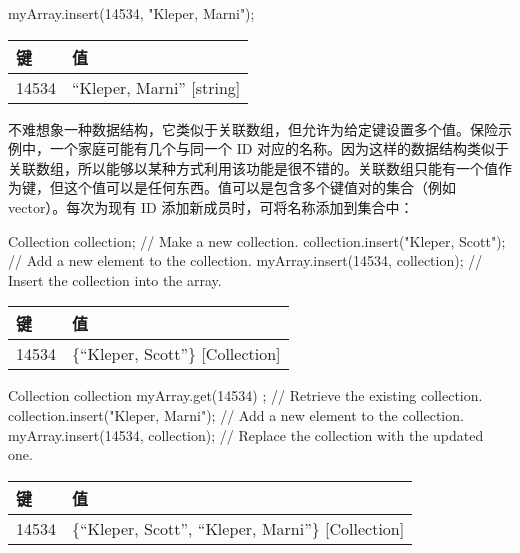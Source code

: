 \begin{cpp}
myArray.insert(14534, "Kleper, Marni");
\end{cpp}

\begin{longtable}{|l|l|}
\hline
\textbf{键} & \textbf{值}              \\ \hline
\endfirsthead
%
\endhead
%
14534         & “Kleper, Marni” {[}string{]} \\ \hline
\end{longtable}

不难想象一种数据结构，它类似于关联数组，但允许为给定键设置多个值。保险示例中，一个家庭可能有几个与同一个 ID 对应的名称。因为这样的数据结构类似于关联数组，所以能够以某种方式利用该功能是很不错的。关联数组只能有一个值作为键，但这个值可以是任何东西。值可以是包含多个键值对的集合（例如vector）。每次为现有 ID 添加新成员时，可将名称添加到集合中：

\begin{cpp}
Collection collection; // Make a new collection.
collection.insert("Kleper, Scott"); // Add a new element to the collection.
myArray.insert(14534, collection); // Insert the collection into the array.
\end{cpp}

\begin{longtable}{|l|l|}
\hline
\textbf{键} & \textbf{值}                      \\ \hline
\endfirsthead
%
\endhead
%
14534         & \{“Kleper, Scott”\} {[}Collection{]} \\ \hline
\end{longtable}

\begin{cpp}
Collection collection { myArray.get(14534) }; // Retrieve the existing collection.
collection.insert("Kleper, Marni"); // Add a new element to the collection.
myArray.insert(14534, collection); // Replace the collection with the updated one.
\end{cpp}

\begin{longtable}{|l|l|}
\hline
\textbf{键} & \textbf{值}                                       \\ \hline
\endfirsthead
%
\endhead
%
14534         & \{“Kleper, Scott”, “Kleper, Marni”\} {[}Collection{]} \\ \hline
\end{longtable}


